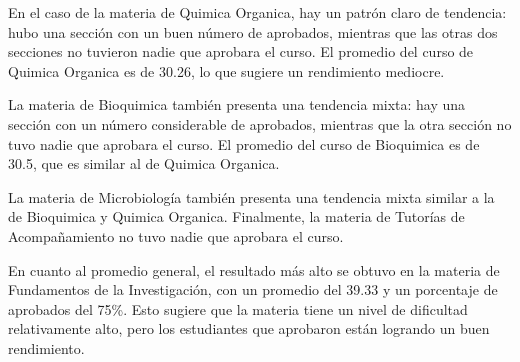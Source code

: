 En el caso de la materia de Quimica Organica, hay un patrón claro de tendencia: hubo una sección con un buen número de aprobados, mientras que las otras dos secciones no tuvieron nadie que aprobara el curso. El promedio del curso de Quimica Organica es de 30.26, lo que sugiere un rendimiento mediocre.

La materia de Bioquimica también presenta una tendencia mixta: hay una sección con un número considerable de aprobados, mientras que la otra sección no tuvo nadie que aprobara el curso. El promedio del curso de Bioquimica es de 30.5, que es similar al de Quimica Organica.

La materia de Microbiología también presenta una tendencia mixta similar a la de Bioquimica y Quimica Organica. Finalmente, la materia de Tutorías de Acompañamiento no tuvo nadie que aprobara el curso.

En cuanto al promedio general, el resultado más alto se obtuvo en la materia de Fundamentos de la Investigación, con un promedio del 39.33 y un porcentaje de aprobados del 75\%. Esto sugiere que la materia tiene un nivel de dificultad relativamente alto, pero los estudiantes que aprobaron están logrando un buen rendimiento.

